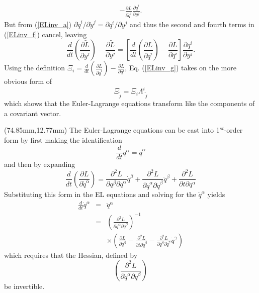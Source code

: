 \begin{textblock*}{75mm}
\begin{eqnarray}
	      - \frac{\partial L}{\partial {\dot q}^i} \frac{\partial {\dot q}^i}{\partial y^j} .\nonumber
\end{eqnarray}
But from (\ref{ELinv_a}) $ {\partial {\dot q}^i}/{\partial {\dot y}^j} = {\partial q^i}/{\partial y^j}$ and thus the second and
fourth terms in (\ref{ELinv_f}) cancel, leaving
\begin{equation}\label{ELinv_g}
  \frac{d}{dt} \left( \frac{\partial \tilde L}{\partial {\dot y}^j } \right) - \frac{\partial \tilde L}{\partial y^j} = 
  \left[ \frac{d}{d t} \left( \frac{\partial L}{\partial {\dot q}^i} \right) - \frac{\partial L}{\partial q^i} \right] 
  \frac{\partial q^i}{\partial y^j} .
\end{equation}
Using the definition $\Xi_i = \frac{d}{dt}\left(\frac{\partial L}{\partial \dot q^i} \right) - \frac{\partial L}{\partial q^i}$,
Eq. (\ref{ELinv_g}) takes on the more obvious form of
\begin{equation}\label{ELinv_h}
  \Xi_{\tilde j} = \Xi_i {\Lambda^i}_{\tilde j}
\end{equation}
which shows that the Euler-Lagrange equations transform like the components of a covariant vector.
\end{textblock*}



\begin{textblock*}{65mm}(74.85mm,12.77mm)
The Euler-Lagrange equations can be cast into 1$^{st}$-order form by first making the identification
\[
  \frac{d}{d t} q^{\alpha} = {\dot q}^{\alpha}
\]
and then by expanding
\[
  \frac{d}{dt} \left( \frac{\partial L}{\partial {\dot q}^{\alpha}} \right) = 
    \frac{\partial^2 L}{\partial q^{\beta} \partial {\dot q}^{\alpha}} {\dot q}^{\beta} + 
	\frac{\partial^2 L}{\partial {\dot q}^{\alpha} \partial {\dot q}^{\beta}} {\ddot q^{\beta}}         +
	\frac{\partial^2 L}{\partial t \partial q^{\alpha}}                 
\]
Substituting this form in the EL equations and solving for the ${\ddot q}^{\alpha}$ yields
\begin{eqnarray*}
  \frac{d}{dt} {\dot q}^{\alpha} & = & {\ddot q}^{\alpha} \\ 
                                 & = & \left( \frac{\partial^2 L}{\partial {\dot q}^{\alpha} \partial {\dot q}^{\beta}} \right)^{-1} \\
								 &   & \times \left( \frac{\partial L}  {\partial q^{\beta}}                    -
							                         \frac{\partial^2 L}{\partial t \partial {\dot q}^{\beta}}  - 
									                 \frac{\partial^2 L}{\partial q^{\beta} \partial {\dot q}^{\gamma}} {\dot q}^{\gamma} 
									   \right)										  
\end{eqnarray*}
which requires that the Hessian, defined by
\[
  \left( \frac{\partial^2 L}{\partial {\dot q}^{\alpha} \partial {\dot q}^{\beta}} \right)
\]
be invertible.
\end{textblock*}
\newpage
